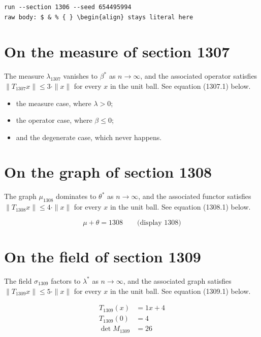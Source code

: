\documentclass{article}
\begin{document}
\begin{verbatim}
run --section 1306 --seed 654495994
raw body: $ & % { } \begin{align} stays literal here
\end{verbatim}

\section{On the measure of section 1307}
The measure $\lambda_{1307}$ vanishes to $\beta^{*}$ as $n \to \infty$,
and the associated operator satisfies $\|T_{1307} x\| \leq 3 \cdot \|x\|$
for every $x$ in the unit ball. See equation (1307.1) below.

\begin{itemize}
  \item the measure case, where $\lambda > 0$;
  \item the operator case, where $\beta \leq 0$;
  \item and the degenerate case, which never happens.
\end{itemize}

\section{On the graph of section 1308}
The graph $\mu_{1308}$ dominates to $\theta^{*}$ as $n \to \infty$,
and the associated functor satisfies $\|T_{1308} x\| \leq 4 \cdot \|x\|$
for every $x$ in the unit ball. See equation (1308.1) below.

$$
\mu + \theta = 1308 \qquad \text{(display 1308)}
$$

\section{On the field of section 1309}
The field $\sigma_{1309}$ factors to $\lambda^{*}$ as $n \to \infty$,
and the associated graph satisfies $\|T_{1309} x\| \leq 5 \cdot \|x\|$
for every $x$ in the unit ball. See equation (1309.1) below.

\begin{align}
T_{1309}(x) &= 1 x + 4 \\
T_{1309}(0) &= 4 \\
\det M_{1309} &= 26
\end{align}
\end{document}
